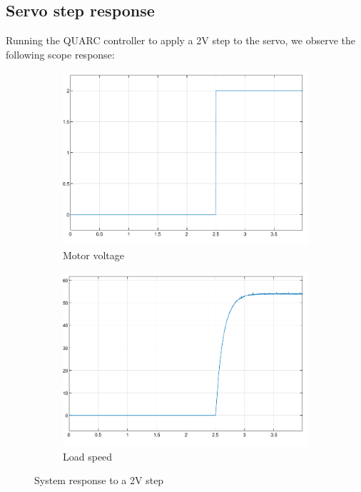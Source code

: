 \documentclass{article}
\begin{document}
\subsection{Servo step response}
Running the QUARC controller to apply a 2V step to the servo, we observe the following scope response:
\begin{figure}[H]
    \centering
    \begin{subfigure}[b]{0.45\linewidth}
        \centering
        \includegraphics[width=\linewidth]{vm1.png}
        \caption{Motor voltage}
        \label{fig:motorvoltage}
    \end{subfigure}
    \hfill
    \begin{subfigure}[b]{0.45\linewidth}
        \centering
        \includegraphics[width=\linewidth]{wm1.png}
        \caption{Load speed}
        \label{fig:loadspeed}
    \end{subfigure}
    \caption{System response to a 2V step}
    \label{fig:2vstep}
\end{figure}
\end{document}
